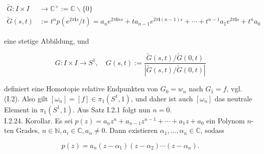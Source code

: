 \documentclass[10pt]{article}
\begin{document}
$$
\begin{aligned}
\tilde{G}: I \times I & \rightarrow \mathbb{C}^{\times}:=\mathbb{C} \backslash\{0\} \\
\tilde{G}(s, t) & :=t^{n} p\left(e^{2 \pi \mathbf{i} s} / t\right)=a_{n} e^{2 \pi \mathbf{i} n s}+t a_{n-1} e^{2 \pi \mathbf{i}(n-1) s}+\cdots+t^{n-1} a_{1} e^{2 \pi \mathbf{i} s}+t^{n} a_{0}
\end{aligned}
$$

eine stetige Abbildung, und

$$
G: I \times I \rightarrow S^{1}, \quad G(s, t):=\frac{\tilde{G}(s, t) / \tilde{G}(0, t)}{|\tilde{G}(s, t) / \tilde{G}(0, t)|}
$$

definiert eine Homotopie relative Endpunkten von $G_{0}=w_{n}$ nach $G_{1}=f$, vgl. (I.2). Also gilt $\left[\omega_{n}\right]=[f] \in \pi_{1}\left(S^{1}, 1\right)$, und daher ist auch $\left[\omega_{n}\right]$ das neutrale Element in $\pi_{1}\left(S^{1}, 1\right)$. Aus Satz I.2.1 folgt nun $n=0$.\\
I.2.24. Korollar. Es sei $p(z)=a_{n} z^{n}+a_{n-1} z^{n-1}+\cdots+a_{1} z+a_{0}$ ein Polynom $n$-ten Grades, $n \in \mathbb{N}, a_{i} \in \mathbb{C}, a_{n} \neq 0$. Dann existieren $\alpha_{1}, \ldots, \alpha_{n} \in \mathbb{C}$, sodass

$$
p(z)=a_{n}\left(z-\alpha_{1}\right)\left(z-\alpha_{2}\right) \cdots\left(z-\alpha_{n}\right) .
$$
\end{document}
